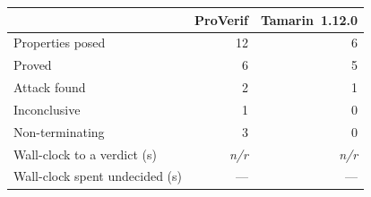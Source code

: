 \begin{tabular}{@{}lrr@{}}
\toprule
 & ProVerif & Tamarin~1.12.0 \\
\midrule
Properties posed & 12 & 6 \\
Proved & 6 & 5 \\
Attack found & 2 & 1 \\
Inconclusive & 1 & 0 \\
Non-terminating & 3 & 0 \\
\midrule
Wall-clock to a verdict (s) & \textit{n/r} & \textit{n/r} \\
Wall-clock spent undecided (s) & --- & --- \\
\bottomrule
\end{tabular}
